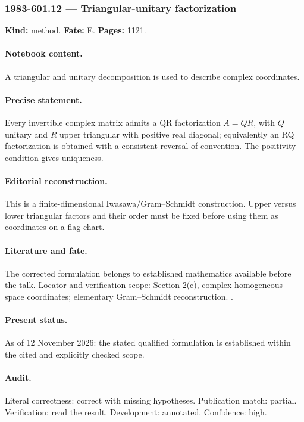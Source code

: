 \subsubsection{1983-601.12 --- Triangular-unitary factorization}

\label{item:1983-601.12}

\noindent\textbf{Kind:} method. \textbf{Fate:} E. \textbf{Pages:} 1121.\par

\paragraph{Notebook content.} A triangular and unitary decomposition is used to describe complex coordinates.

\paragraph{Precise statement.} Every invertible complex matrix admits a QR factorization \(A=QR\), with \(Q\) unitary and \(R\) upper triangular with positive real diagonal; equivalently an RQ factorization is obtained with a consistent reversal of convention. The positivity condition gives uniqueness.

\paragraph{Editorial reconstruction.} This is a finite-dimensional Iwasawa/Gram--Schmidt construction. Upper versus lower triangular factors and their order must be fixed before using them as coordinates on a flag chart.

\paragraph{Literature and fate.} The corrected formulation belongs to established mathematics available before the talk. Locator and verification scope: Section 2(c), complex homogeneous-space coordinates; elementary Gram--Schmidt reconstruction. \cite{perelomov1981instantons}.

\paragraph{Present status.} As of 12 November 2026: the stated qualified formulation is established within the cited and explicitly checked scope.

\paragraph{Audit.} Literal correctness: correct with missing hypotheses. Publication match: partial. Verification: read the result. Development: annotated. Confidence: high.

